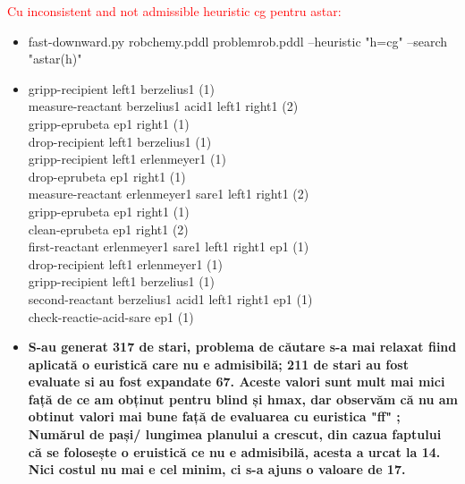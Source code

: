 \textcolor{red}{Cu inconsistent and not admissible heuristic cg pentru astar:}
   \begin{itemize}
    \setlength\itemsep{0em}
    \item   fast-downward.py robchemy.pddl problemrob.pddl --heuristic "h=cg" --search "astar(h)"
    \item gripp-recipient left1 berzelius1 (1) \\
measure-reactant berzelius1 acid1 left1 right1 (2)\\
gripp-eprubeta ep1 right1 (1)\\
drop-recipient left1 berzelius1 (1)\\
gripp-recipient left1 erlenmeyer1 (1)\\
drop-eprubeta ep1 right1 (1)\\
measure-reactant erlenmeyer1 sare1 left1 right1 (2)\\
gripp-eprubeta ep1 right1 (1)\\
clean-eprubeta ep1 right1 (2)\\
first-reactant erlenmeyer1 sare1 left1 right1 ep1 (1)\\
drop-recipient left1 erlenmeyer1 (1)\\
gripp-recipient left1 berzelius1 (1)\\
second-reactant berzelius1 acid1 left1 right1 ep1 (1)\\
check-reactie-acid-sare ep1 (1)\\
    \item \textbf{S-au generat 317 de stari, problema de căutare s-a mai relaxat fiind aplicată o euristică care nu e admisibilă; 211 de stari au fost evaluate si au fost expandate 67. Aceste valori sunt mult mai mici față de ce am obținut pentru blind și hmax, dar observăm că nu am obtinut valori mai bune față de evaluarea cu euristica "ff" ; Numărul de pași/ lungimea planului a crescut, din cazua faptului că se folosește o eruistică ce nu e admisibilă, acesta a urcat la 14. Nici costul nu mai e cel minim, ci s-a ajuns o valoare de 17.}
\end{itemize}

